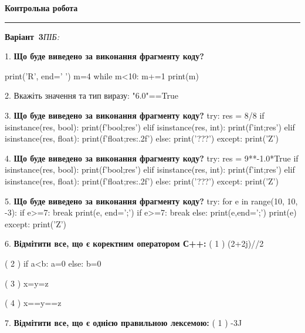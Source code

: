\documentclass[11pt]{article}
\begin{document}
{\centering\Large\bfseries Контрольна робота\par}
\medskip
\noindent\rule{\linewidth}{0.5pt}
\smallskip
\noindent\textbf{Варіант \No\,3}\hfill \textit{ПІБ:}\,\underline{\hspace{60mm}}
\vspace{4mm}

1. \textbf{Що буде виведено за виконання фрагменту коду?}

print('R', end=' ')
m=4
while m<10:
    m+=1
print(m)

\vspace{5mm}

2. 
Вкажіть значення та тип виразу:
"6.0"==True
\vspace{5mm}

3. \textbf{Що буде виведено за виконання фрагменту коду?}
try:
    res = 8/8%
    if isinstance(res, bool):
        print(f'bool;{res}')
    elif isinstance(res, int):
        print(f'int;{res}')
    elif isinstance(res, float):
        print(f'float;{res:.2f}')
    else:
        print('???')
except:
    print('Z')
\vspace{5mm}

4. \textbf{Що буде виведено за виконання фрагменту коду?}
try:
    res = 9**-1.0*True
    if isinstance(res, bool):
        print(f'bool;{res}')
    elif isinstance(res, int):
        print(f'int;{res}')
    elif isinstance(res, float):
        print(f'float;{res:.2f}')
    else:
        print('???')
except:
    print('Z')
\vspace{5mm}

5. \textbf{Що буде виведено за виконання фрагменту коду?}
try:
    for e in range(10, 10, -3):
        if e>=7:
            break
        print(e, end=';')
        if e>=7:
            break
    else:
        print(e,end=';')
    print(e)
except:
    print('Z')
\vspace{5mm}

6. %
\textbf{Відмітити все, що є коректним оператором С++:}
( 1 ) (2+2j)//2

( 2 ) if a<b: a=0 else: b=0

( 3 ) x=y=z

( 4 ) x==y==z
\vspace{5mm}

7. %
\textbf{Відмітити все, що є однією правильною лексемою:}
( 1 ) -3J
\end{document}
